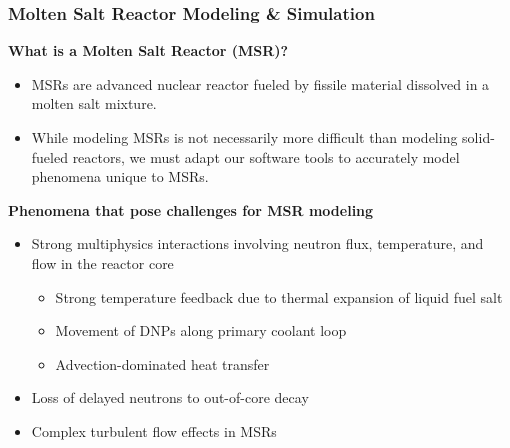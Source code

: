 
\begin{frame}
  \frametitle{Molten Salt Reactor Modeling \& Simulation}
  \textbf{What is a Molten Salt Reactor (MSR)?}
  \begin{itemize}
	\item MSRs are advanced nuclear reactor fueled by fissile
	  material dissolved in a molten salt mixture.
    \item While modeling MSRs is not necessarily more difficult than modeling solid-fueled
      reactors, we must adapt our software tools to accurately model phenomena unique to MSRs.
  \end{itemize}

  \textbf{Phenomena that pose challenges for MSR modeling}
  \begin{itemize}
	\item Strong multiphysics interactions involving neutron flux, temperature, and flow in the
      reactor core
	  \begin{itemize}
		\item Strong temperature feedback due to thermal expansion of liquid fuel salt
		\item Movement of \glspl{DNP} along primary coolant loop
        \item Advection-dominated heat transfer
	  \end{itemize}
    \item Loss of delayed neutrons to out-of-core decay
    \item Complex turbulent flow effects in MSRs
  \end{itemize}
\end{frame}

